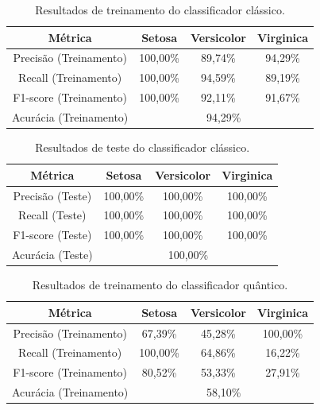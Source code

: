 \begin{table}[H]
\centering
\caption{Resultados de treinamento do classificador clássico.}
\begin{tabular}{|c|c|c|c|}
\hline
\textbf{Métrica} & \textbf{Setosa} & \textbf{Versicolor} & \textbf{Virginica} \\ \hline
Precisão (Treinamento) & 100,00\% & 89,74\% & 94,29\% \\ \hline
Recall (Treinamento) & 100,00\% & 94,59\% & 89,19\% \\ \hline
F1-score (Treinamento) & 100,00\% & 92,11\% & 91,67\% \\ \hline
Acurácia (Treinamento) & \multicolumn{3}{|c|}{94,29\%} \\ \hline
\end{tabular}
\end{table}

\begin{table}[H]
\centering
\caption{Resultados de teste do classificador clássico.}
\begin{tabular}{|c|c|c|c|}
\hline
\textbf{Métrica} & \textbf{Setosa} & \textbf{Versicolor} & \textbf{Virginica} \\ \hline
Precisão (Teste) & 100,00\% & 100,00\% & 100,00\% \\ \hline
Recall (Teste) & 100,00\% & 100,00\% & 100,00\% \\ \hline
F1-score (Teste) & 100,00\% & 100,00\% & 100,00\% \\ \hline
Acurácia (Teste) & \multicolumn{3}{|c|}{100,00\%} \\ \hline
\end{tabular}
\end{table}


\begin{table}[H]
\centering
\caption{Resultados de treinamento do classificador quântico.}
\begin{tabular}{|c|c|c|c|}
\hline
\textbf{Métrica} & \textbf{Setosa} & \textbf{Versicolor} & \textbf{Virginica} \\ \hline
Precisão (Treinamento) & 67,39\% & 45,28\% & 100,00\% \\ \hline
Recall (Treinamento) & 100,00\% & 64,86\% & 16,22\% \\ \hline
F1-score (Treinamento) & 80,52\% & 53,33\% & 27,91\% \\ \hline
Acurácia (Treinamento) & \multicolumn{3}{|c|}{58,10\%} \\ \hline
\end{tabular}
\end{table}

